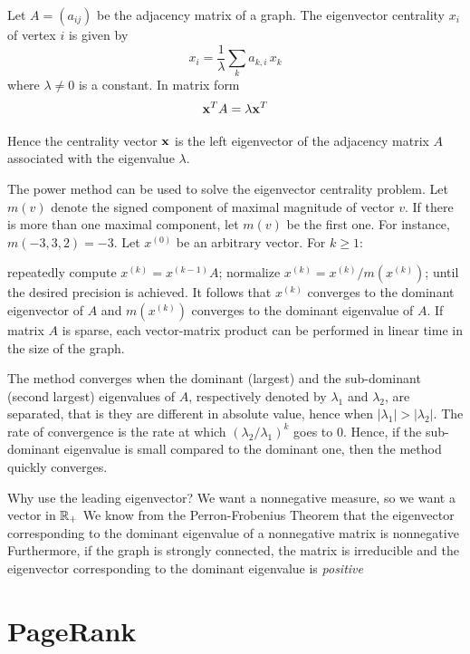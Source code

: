 \documentclass[aspectratio=169]{beamer}
\begin{document}
\begin{frame}
	Let $A = (a_{ij})$ be the adjacency matrix of a graph. The eigenvector centrality $x_{i}$ of vertex $i$ is given by
	$$
	x_i = \frac{1}{\lambda} \sum_k a_{k,i} \, x_k
	$$ 
	where $\lambda \neq 0$ is a constant. In matrix form
	$$
	\mathbf{x}^T A=\lambda\mathbf{x}^T
	$$

Hence the centrality vector $\mathbf{x}$ is the left eigenvector of the adjacency matrix $A$ associated with the eigenvalue $\lambda$. 
\end{frame}


\begin{frame} 
The power method can be used to solve the eigenvector centrality problem. Let $m(v)$ denote the signed component of maximal magnitude of vector $v$. If there is more than one maximal component, let $m(v)$ be the first one. For instance, $m(-3,3,2) = -3$. Let $x^{(0)}$ be an arbitrary vector. For $k \geq 1$:

repeatedly compute $x^{(k)} = x^{(k-1)} A$;
normalize $x^{(k)} = x^{(k)} / m(x^{(k)})$;
until the desired precision is achieved. It follows that $x^{(k)}$ converges to the dominant eigenvector of $A$ and $m(x^{(k)})$ converges to the dominant eigenvalue of $A$. If matrix $A$ is sparse, each vector-matrix product can be performed in linear time in the size of the graph.

The method converges when the dominant (largest) and the sub-dominant (second largest) eigenvalues of $A$, respectively denoted by $\lambda_1$ and $\lambda_2$, are separated, that is they are different in absolute value, hence when $|\lambda_1| > |\lambda_2|$. The rate of convergence is the rate at which $(\lambda_2 / \lambda_1)^k$ goes to $0$. Hence, if the sub-dominant eigenvalue is small compared to the dominant one, then the method quickly converges.
\end{frame}


\begin{frame}{Why use the leading eigenvector?}
	We want a nonnegative measure, so we want a vector in $\mathbb{R}_+$
	\vfill
	We know from the Perron-Frobenius Theorem that the eigenvector corresponding to the dominant eigenvalue of a nonnegative matrix is nonnegative
	\vfill
	Furthermore, if the graph is strongly connected, the matrix is irreducible and the eigenvector corresponding to the dominant eigenvalue is \emph{positive}
\end{frame}


\section{PageRank}
\end{document}
